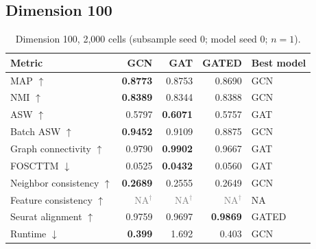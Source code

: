 \documentclass[10pt]{article}
\begin{document}
\subsection{Dimension 100}
\begin{table}[H]\centering\small
\caption{Dimension 100, 2,000 cells (subsample seed 0; model seed 0; $n=1$).}
\begin{tabular}{@{}lrrrl@{}}\toprule
Metric & GCN & GAT & GATED & Best model \\\midrule
MAP $\uparrow$ & \textbf{0.8773} & 0.8753 & 0.8690 & GCN \\
NMI $\uparrow$ & \textbf{0.8389} & 0.8344 & 0.8388 & GCN \\
ASW $\uparrow$ & 0.5797 & \textbf{0.6071} & 0.5757 & GAT \\
Batch ASW $\uparrow$ & \textbf{0.9452} & 0.9109 & 0.8875 & GCN \\
Graph connectivity $\uparrow$ & 0.9790 & \textbf{0.9902} & 0.9667 & GAT \\
FOSCTTM $\downarrow$ & 0.0525 & \textbf{0.0432} & 0.0560 & GAT \\
Neighbor consistency $\uparrow$ & \textbf{0.2689} & 0.2555 & 0.2649 & GCN \\
Feature consistency $\uparrow$ & \textcolor{gray}{NA$^{\dagger}$} & \textcolor{gray}{NA$^{\dagger}$} & \textcolor{gray}{NA$^{\dagger}$} & NA \\
Seurat alignment $\uparrow$ & 0.9759 & 0.9697 & \textbf{0.9869} & GATED \\
Runtime $\downarrow$ & \textbf{0.399} & 1.692 & 0.403 & GCN \\
\bottomrule\end{tabular}
\end{table}
\end{document}
